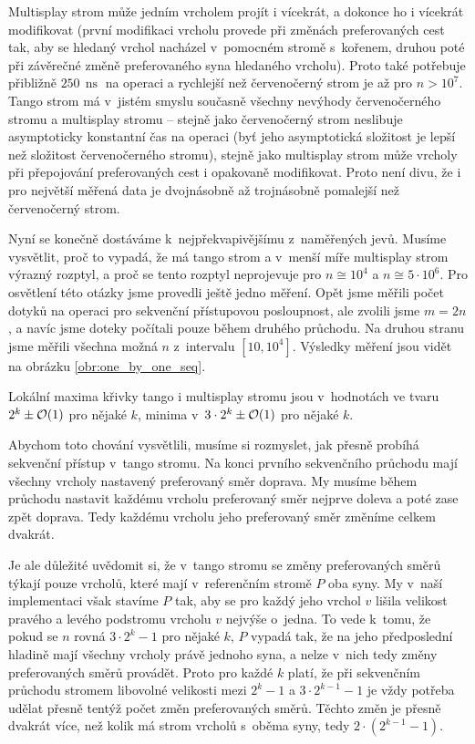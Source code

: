 Multisplay strom může jedním vrcholem projít i vícekrát, a dokonce
ho i vícekrát modifikovat (první modifikaci vrcholu provede při změnách
preferovaných cest tak, aby se hledaný vrchol nacházel v~pomocném stromě s~kořenem,
druhou poté při závěrečné změně preferovaného syna hledaného vrcholu). Proto
také potřebuje přibližně $250\,\operatorname{ns}$ na operaci a rychlejší než
červenočerný strom je až pro $n> 10^7$. Tango strom má v~jistém smyslu
současně všechny nevýhody červenočerného stromu a multisplay stromu -- stejně
jako červenočerný strom neslibuje asymptoticky konstantní čas na operaci (byť
jeho asymptotická složitost je lepší než složitost červenočerného stromu),
stejně jako multisplay strom může vrcholy při přepojování preferovaných cest i
opakovaně modifikovat. Proto není divu, že i pro největší měřená data je
dvojnásobně až trojnásobně pomalejší než červenočerný strom.

Nyní se konečně dostáváme k~nejpřekvapivějšímu z~naměřených jevů. Musíme
vysvětlit, proč to vypadá, že má tango strom a v~menší míře multisplay strom
výrazný rozptyl, a proč se tento rozptyl neprojevuje pro $n\cong  10^4$ a
$n\cong 5\cdot10^6$. Pro osvětlení této otázky jsme provedli ještě jedno
měření. Opět jsme měřili počet dotyků na operaci pro sekvenční přístupovou
posloupnost, ale zvolili jsme $m=2n$, a navíc jsme doteky počítali pouze během
druhého průchodu. Na druhou stranu jsme měřili všechna možná $n$ z~intervalu
$[10, 10^4]$. Výsledky měření jsou vidět na obrázku
\ref{obr:one_by_one_seq}.


Lokální maxima křivky tango i multisplay stromu jsou v~hodnotách ve tvaru $2^k \pm \mathcal O(1)$ pro nějaké $k$, minima v~$3\cdot 2^k\pm \mathcal O(1)$ pro nějaké $k$. 

Abychom toto chování vysvětlili, musíme si rozmyslet, jak přesně probíhá
sekvenční přístup v~tango stromu. Na konci prvního sekvenčního průchodu mají
všechny vrcholy nastavený preferovaný směr doprava. My musíme během průchodu
nastavit každému vrcholu preferovaný směr nejprve doleva a poté zase zpět
doprava. Tedy každému vrcholu jeho preferovaný směr změníme celkem dvakrát.

Je ale důležité uvědomit si, že v~tango stromu se změny preferovaných směrů
týkají pouze vrcholů, které mají v~referenčním stromě $P$ oba syny. My v~naší
implementaci však stavíme $P$ tak, aby se pro každý jeho vrchol $v$ lišila
velikost pravého a levého podstromu vrcholu $v$ nejvýše o~jedna. To vede k~tomu, že pokud se
$n$ rovná $3\cdot2^k-1$ pro nějaké $k$, $P$ vypadá tak, že na jeho předposlední
hladině mají všechny vrcholy právě jednoho syna, a nelze v~nich tedy změny
preferovaných směrů provádět. Proto pro každé $k$ platí, že při sekvenčním
průchodu stromem libovolné velikosti mezi $2^k-1$ a $3\cdot 2^{k-1}-1$ je vždy
potřeba udělat přesně tentýž počet změn preferovaných směrů. Těchto změn je přesně
dvakrát více, než kolik má strom vrcholů s~oběma syny, tedy $2\cdot(2^{k-1} -1)$.

